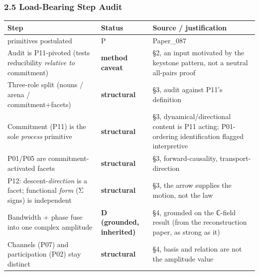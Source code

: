 \documentclass[
  11pt,
]{article}
\newcounter{none} %
\begin{document}
\subsubsection{2.5 Load-Bearing Step
Audit}\label{load-bearing-step-audit}

{\def\LTcaptype{none} %
\begin{longtable}[]{@{}
  >{\raggedright\arraybackslash}p{}
  >{\raggedright\arraybackslash}p{}
  >{\raggedright\arraybackslash}p{}@{}}
\toprule\noalign{}
\begin{minipage}[b]{\linewidth}\raggedright
Step
\end{minipage} & \begin{minipage}[b]{\linewidth}\raggedright
Status
\end{minipage} & \begin{minipage}[b]{\linewidth}\raggedright
Source / justification
\end{minipage} \\
\midrule\noalign{}
\endhead
\bottomrule\noalign{}
\endlastfoot
13 primitives postulated & P & Paper\_087 \\
Audit is P11-pivoted (tests reducibility \emph{relative to} commitment)
& \textbf{method caveat} & §2, an input motivated by the keystone
pattern, not a neutral all-pairs proof \\
Three-role split (nouns / arena / commitment+facets) &
\textbf{structural} & §3, audit against P11's definition \\
Commitment (P11) is the sole \emph{process} primitive &
\textbf{structural} & §3, dynamical/directional content is P11 acting;
P01-ordering identification flagged interpretive \\
P01/P05 are commitment-activated facets & \textbf{structural} & §3,
forward-causality, transport-direction \\
P12: descent-\emph{direction} is a facet; functional \emph{form} (Σ
signs) is independent & \textbf{structural} & §3, the arrow supplies the
motion, not the law \\
Bandwidth + phase fuse into one complex amplitude & \textbf{D (grounded,
inherited)} & §4, grounded on the ℂ-field result (from the
reconstruction paper, as strong as it) \\
Channels (P07) and participation (P02) stay distinct &
\textbf{structural} & §4, basis and relation are not the amplitude
value \\

\end{longtable}}
\end{document}
